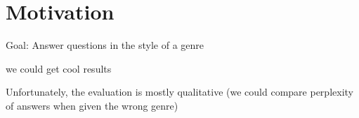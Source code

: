 \section{Motivation}

Goal: Answer questions in the style of a genre

we could get cool results

Unfortunately, the evaluation is mostly qualitative (we could compare perplexity of answers when given the wrong genre)